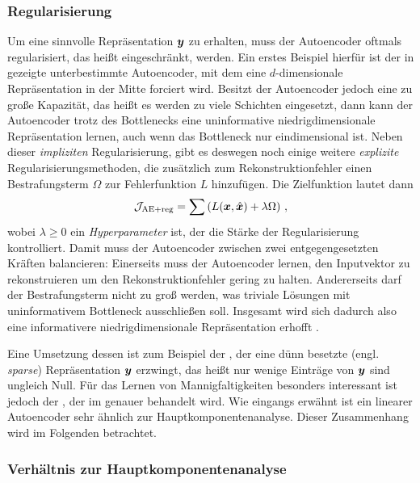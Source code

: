 \subsubsection{Regularisierung}
\label{ch:MethodenDerDimRed:ML:AE:Regularisierung}
Um eine sinnvolle Repräsentation $\bm{y}$ zu erhalten, muss der Autoencoder oftmals
regularisiert, das heißt eingeschränkt, werden. Ein erstes Beispiel hierfür ist der in
 gezeigte unterbestimmte Autoencoder, mit dem eine $d$-dimensionale
Repräsentation in der Mitte forciert wird. Besitzt der Autoencoder jedoch eine zu große Kapazität,
das heißt es werden zu viele Schichten eingesetzt, dann kann der Autoencoder trotz des Bottlenecks
eine uninformative niedrigdimensionale Repräsentation lernen, auch wenn das Bottleneck nur
eindimensional ist. Neben dieser \textit{impliziten} Regularisierung, gibt es deswegen noch einige
weitere \textit{explizite} Regularisierungsmethoden, die zusätzlich zum Rekonstruktionfehler einen
Bestrafungsterm $\Omega$ zur Fehlerfunktion $L$ hinzufügen. Die Zielfunktion lautet dann
\begin{equation}
	\mathcal{J}_{\text{AE+reg}} = \sum \left( L(\bm{x}, \hat{\bm{x}}) + \lambda \Omega \right) \, ,
\end{equation}
wobei $\lambda \geq 0$ ein \textit{Hyperparameter} ist, der die Stärke der Regularisierung kontrolliert. Damit muss der Autoencoder zwischen zwei entgegengesetzten Kräften balancieren: Einerseits muss der Autoencoder lernen, den Inputvektor zu rekonstruieren um den Rekonstruktionfehler gering zu halten. Andererseits darf der Bestrafungsterm nicht zu groß werden, was triviale Lösungen mit uninformativem Bottleneck ausschließen soll. Insgesamt wird sich dadurch also eine informativere niedrigdimensionale Repräsentation erhofft \parencite[516]{Goodfellow.2016}.

Eine Umsetzung dessen ist zum Beispiel der , der eine dünn besetzte
(engl. \textit{sparse}) Repräsentation $\bm{y}$ erzwingt, das heißt nur wenige Einträge von
$\bm{y}$ sind ungleich Null. Für das Lernen von Mannigfaltigkeiten besonders interessant ist
jedoch der  \parencite{Rifai.2011}, der im  genauer behandelt wird. Wie
eingangs erwähnt ist ein linearer Autoencoder sehr ähnlich zur Hauptkomponentenanalyse. Dieser
Zusammenhang wird im Folgenden betrachtet.

\subsubsection{Verhältnis zur Hauptkomponentenanalyse}
\label{ch:MethodenDerDimRed:ML:AE:VerhaeltnisPCA}

